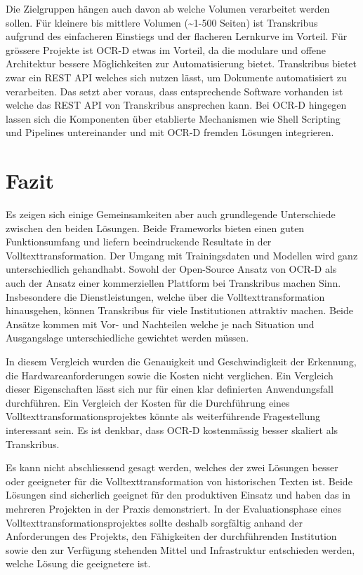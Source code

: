 \documentclass[a4paper,oneside, 12pt]{report}
\begin{document}
Die Zielgruppen hängen auch davon ab welche Volumen verarbeitet werden sollen. Für kleinere bis mittlere Volumen (\textasciitilde1-500 Seiten) ist Transkribus aufgrund des einfacheren Einstiegs und der flacheren Lernkurve im Vorteil. Für grössere Projekte ist OCR-D etwas im Vorteil, da die modulare und offene Architektur bessere Möglichkeiten zur Automatisierung bietet. Transkribus bietet zwar ein REST API welches sich nutzen lässt, um Dokumente automatisiert zu verarbeiten. Das setzt aber voraus, dass entsprechende Software vorhanden ist welche das REST API von Transkribus ansprechen kann. Bei OCR-D hingegen lassen sich die Komponenten über etablierte Mechanismen wie Shell Scripting und Pipelines untereinander und mit OCR-D fremden Lösungen integrieren.

\section{Fazit}
Es zeigen sich einige Gemeinsamkeiten aber auch grundlegende Unterschiede zwischen den beiden Lösungen. Beide Frameworks bieten einen guten Funktionsumfang und liefern beeindruckende Resultate in der Volltexttransformation. Der Umgang mit Trainingsdaten und Modellen wird ganz unterschiedlich gehandhabt. Sowohl der Open-Source Ansatz von OCR-D als auch der Ansatz einer kommerziellen Plattform bei Transkribus machen Sinn. Insbesondere die Dienstleistungen, welche über die Volltexttransformation hinausgehen, können Transkribus für viele Institutionen attraktiv machen. Beide Ansätze kommen mit Vor- und Nachteilen welche je nach Situation und Ausgangslage unterschiedliche gewichtet werden müssen. 

In diesem Vergleich wurden die Genauigkeit und Geschwindigkeit der Erkennung, die Hardwareanforderungen sowie die Kosten nicht verglichen. Ein Vergleich dieser Eigenschaften lässt sich nur für einen klar definierten Anwendungsfall durchführen. Ein Vergleich der Kosten für die Durchführung eines Volltexttransformationsprojektes könnte als weiterführende Fragestellung interessant sein. Es ist denkbar, dass OCR-D kostenmässig besser skaliert als Transkribus.

Es kann nicht abschliessend gesagt werden, welches der zwei Lösungen besser oder geeigneter für die Volltexttransformation von historischen Texten ist. Beide Lösungen sind sicherlich geeignet für den produktiven Einsatz und haben das in mehreren Projekten in der Praxis demonstriert. In der Evaluationsphase eines Volltexttransformationsprojektes sollte deshalb sorgfältig anhand der Anforderungen des Projekts, den Fähigkeiten der durchführenden Institution sowie den zur Verfügung stehenden Mittel und Infrastruktur entschieden werden, welche Lösung die geeignetere ist.
\end{document}

